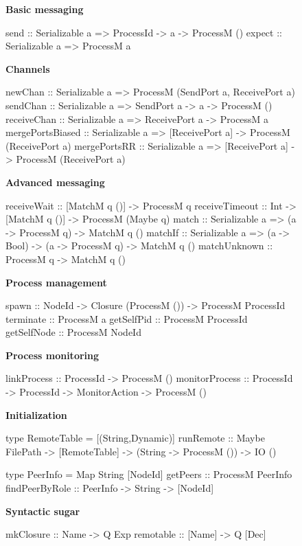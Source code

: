 \documentclass[preprint]{sigplanconf}
\begin{document}
\begin{figure}[t!]
\small
\textbf{Basic messaging} 
\begin{code}
send   :: Serializable a => ProcessId -> a
       -> ProcessM ()
expect :: Serializable a => ProcessM a
\end{code}
 \textbf{Channels}
\begin{code}
newChan  :: Serializable a 
         => ProcessM (SendPort a, ReceivePort a)
sendChan :: Serializable a 
         => SendPort a -> a -> ProcessM ()
receiveChan :: Serializable a => ReceivePort a
            -> ProcessM a
mergePortsBiased :: Serializable a => [ReceivePort a]
                 -> ProcessM (ReceivePort a)
mergePortsRR :: Serializable a => [ReceivePort a] 
             -> ProcessM (ReceivePort a)
\end{code}

 \textbf{Advanced messaging}
\begin{code}
receiveWait    :: [MatchM q ()] -> ProcessM q
receiveTimeout :: Int -> [MatchM q ()] 
               -> ProcessM (Maybe q)
match   :: Serializable a => (a -> ProcessM q) 
        -> MatchM q ()
matchIf :: Serializable a => (a -> Bool) 
        -> (a -> ProcessM q) -> MatchM q ()
matchUnknown :: ProcessM q -> MatchM q ()
\end{code}

 \textbf{Process management}
\begin{code}
spawn :: NodeId -> Closure (ProcessM ()) 
      -> ProcessM ProcessId
terminate :: ProcessM a
getSelfPid :: ProcessM ProcessId
getSelfNode :: ProcessM NodeId
\end{code}

 \textbf{Process monitoring}
\begin{code}
linkProcess :: ProcessId -> ProcessM ()
monitorProcess :: ProcessId -> ProcessId 
               -> MonitorAction -> ProcessM ()
\end{code}

 \textbf{Initialization}
\begin{code}
type RemoteTable = [(String,Dynamic)]
runRemote      :: Maybe FilePath -> [RemoteTable] 
               -> (String -> ProcessM ()) -> IO ()

type PeerInfo = Map String [NodeId]
getPeers       :: ProcessM PeerInfo
findPeerByRole :: PeerInfo -> String -> [NodeId]
\end{code}

 \textbf{Syntactic sugar}
\begin{code}
mkClosure     :: Name   -> Q Exp
remotable :: [Name] -> Q [Dec]
\end{code}


\end{figure}
\end{document}

